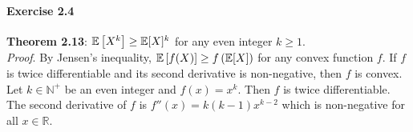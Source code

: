 \paragraph{Exercise 2.4} $~$ \\[0.2cm]
\textbf{Theorem 2.13}: $\mathbb{E}\left[X^k \right] \geq \mathbb{E}[X]^k$ for any even integer
$k \geq 1$. \\[0.2cm]
\textit{Proof}. By Jensen's inequality, $\mathbb{E}\left[f(X)\right] \geq f\left(\mathbb{E}[X]\right)$
for any convex function $f$. If $f$ is twice differentiable and its second
derivative is non-negative, then $f$ is convex. Let $k \in \mathbb{N}^+$ be an
even integer and $f(x) = x^k$. Then $f$ is twice differentiable. The second
derivative of $f$ is $f''(x) = k(k - 1)x^{k-2}$ which is non-negative for all
$x \in \mathbb{R}$.
